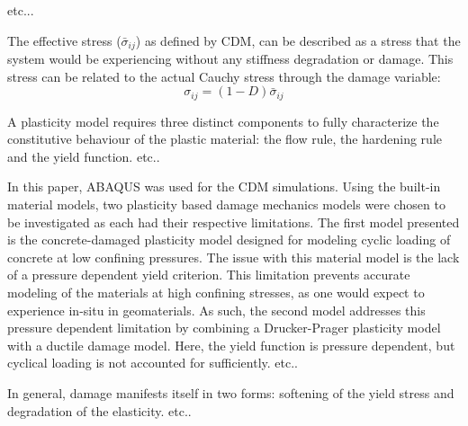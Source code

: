 etc...

The effective stress ($\bar{\sigma}_{ij}$) as defined by CDM, can be described as a stress that the system would be experiencing without any stiffness degradation or damage. This stress can be related to the actual Cauchy stress through the damage variable: 
\begin{equation}
\sigma_{ij}=\left(1-D\right)\bar{\sigma}_{ij}
\label{eqn:const7}
\end{equation}

A plasticity model requires three distinct components to fully characterize the constitutive behaviour of the plastic material: the flow rule, the hardening rule and the yield function. etc.. 

In this paper, ABAQUS was used for the CDM simulations. Using the built-in material models, two plasticity based damage mechanics models were chosen to be investigated as each had their respective limitations. The first model presented is the concrete-damaged plasticity model designed for modeling cyclic loading of concrete at low confining pressures. The issue with this material model is the lack of a pressure dependent yield criterion. This limitation prevents accurate modeling of the materials at high confining stresses, as one would expect to experience in-situ in geomaterials. As such, the second model addresses this pressure dependent limitation by combining a Drucker-Prager plasticity model with a ductile damage model. Here, the yield function is pressure dependent, but cyclical loading is not accounted for sufficiently. etc..

 In general, damage manifests itself in two forms: softening of the yield stress and degradation of the elasticity. etc..

